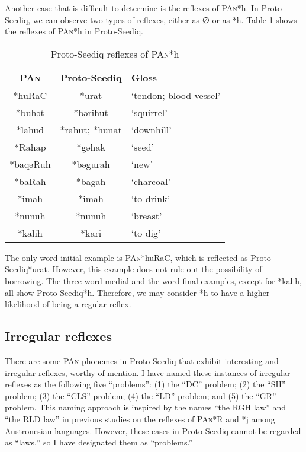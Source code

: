 \documentclass[12pt]{article}
\newcommand{\pan}{\textsc{PAn}\xspace}
\newcommand{\psedf}{Proto-Seediq\xspace}
\begin{document}
Another case that is difficult to determine is the reflexes of \pan *h. In \psedf, we can observe two types of reflexes, either as ∅ or as *h. Table \ref{tab:panhref} shows the reflexes of \pan *h in \psedf. 

\begin{table}[!htbp]
\centering
\caption{\psedf reflexes of \pan *h}
\label{tab:panhref}
\begin{tabular}{ccl}
\hline
\pan     & \psedf         & Gloss                  \\ \hline
*huRaC   & *urat          & `tendon; blood vessel' \\
*buhət   & *bərihut       & `squirrel'             \\
*lahud   & *rahut; *hunat & `downhill'             \\
*Rahap   & *gəhak         & `seed'                 \\
*baqəRuh & *bəgurah       & `new'                  \\
*baRah   & *bagah         & `charcoal'             \\
*imah    & *imah          & `to drink'             \\
*nunuh   & *nunuh         & `breast'               \\
*kalih   & *kari          & `to dig'               \\ \hline
\end{tabular}
\end{table}

The only word-initial example is \pan *huRaC, which is reflected as \psedf *urat. However, this example does not rule out the possibility of borrowing. The three word-medial and the word-final examples, except for *kalih, all show \psedf *h. Therefore, we may consider *h to have a higher likelihood of being a regular reflex. 

\subsection{Irregular reflexes}

There are some \pan phonemes in \psedf that exhibit interesting and irregular reflexes, worthy of mention. I have named these instances of irregular reflexes as the following five ``problems'': (1) the ``DC'' problem; (2) the ``SH'' problem; (3) the ``CLS'' problem; (4) the ``LD'' problem; and (5) the ``GR'' problem. This naming approach is inspired by the names ``the RGH law'' and ``the RLD law'' in previous studies on the reflexes of \pan *R and *j among Austronesian languages. However, these cases in \psedf cannot be regarded as ``laws,'' so I have designated them as ``problems.''
\end{document}
